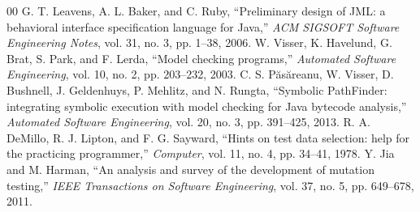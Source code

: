 \documentclass[conference]{IEEEtran}
\begin{document}
\begin{thebibliography}{00}
 G. T. Leavens, A. L. Baker, and C. Ruby, ``Preliminary design of JML: a behavioral interface specification language for Java,'' \textit{ACM SIGSOFT Software Engineering Notes}, vol. 31, no. 3, pp. 1--38, 2006.
 W. Visser, K. Havelund, G. Brat, S. Park, and F. Lerda, ``Model checking programs,'' \textit{Automated Software Engineering}, vol. 10, no. 2, pp. 203--232, 2003.
 C. S. P\u{a}s\u{a}reanu, W. Visser, D. Bushnell, J. Geldenhuys, P. Mehlitz, and N. Rungta, ``Symbolic PathFinder: integrating symbolic execution with model checking for Java bytecode analysis,'' \textit{Automated Software Engineering}, vol. 20, no. 3, pp. 391--425, 2013.
 R. A. DeMillo, R. J. Lipton, and F. G. Sayward, ``Hints on test data selection: help for the practicing programmer,'' \textit{Computer}, vol. 11, no. 4, pp. 34--41, 1978.
 Y. Jia and M. Harman, ``An analysis and survey of the development of mutation testing,'' \textit{IEEE Transactions on Software Engineering}, vol. 37, no. 5, pp. 649--678, 2011.
\end{thebibliography}
\end{document}
